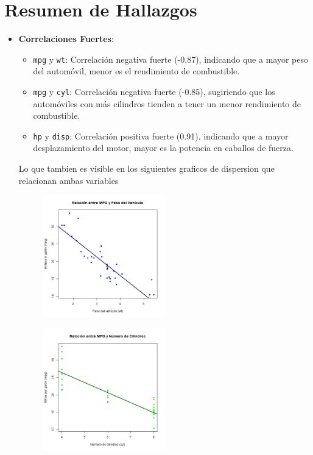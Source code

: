 \documentclass{article}
\begin{document}
\section{Resumen de Hallazgos}
\begin{itemize}
	\item \textbf{Correlaciones Fuertes}:
	      \begin{itemize}
		      \item \texttt{mpg} y \texttt{wt}: Correlación negativa fuerte (-0.87), indicando que a mayor peso del automóvil, menor es el rendimiento de combustible.
		      \item \texttt{mpg} y \texttt{cyl}: Correlación negativa fuerte (-0.85), sugiriendo que los automóviles con más cilindros tienden a tener un menor rendimiento de combustible.
		      \item \texttt{hp} y \texttt{disp}: Correlación positiva fuerte (0.91), indicando que a mayor desplazamiento del motor, mayor es la potencia en caballos de fuerza.
	      \end{itemize}
	      Lo que tambien es visible en los siguientes graficos de dispersion que relacionan ambas variables

	      \begin{figure}[H]
		      \centering
		      \includegraphics[width=0.5\textwidth]{mpg_vs_wt.png}
		      \label{fig:mpg_vs_wt}
		      \vspace{0.5cm} %
	      \end{figure}

	      \begin{figure}[H]
		      \centering
		      \includegraphics[width=0.5\textwidth]{mpg_vs_cyl.png}
		      \label{fig:mpg_vs_cyl}
		      \vspace{0.5cm} %
	      \end{figure}


\end{itemize}
\end{document}
